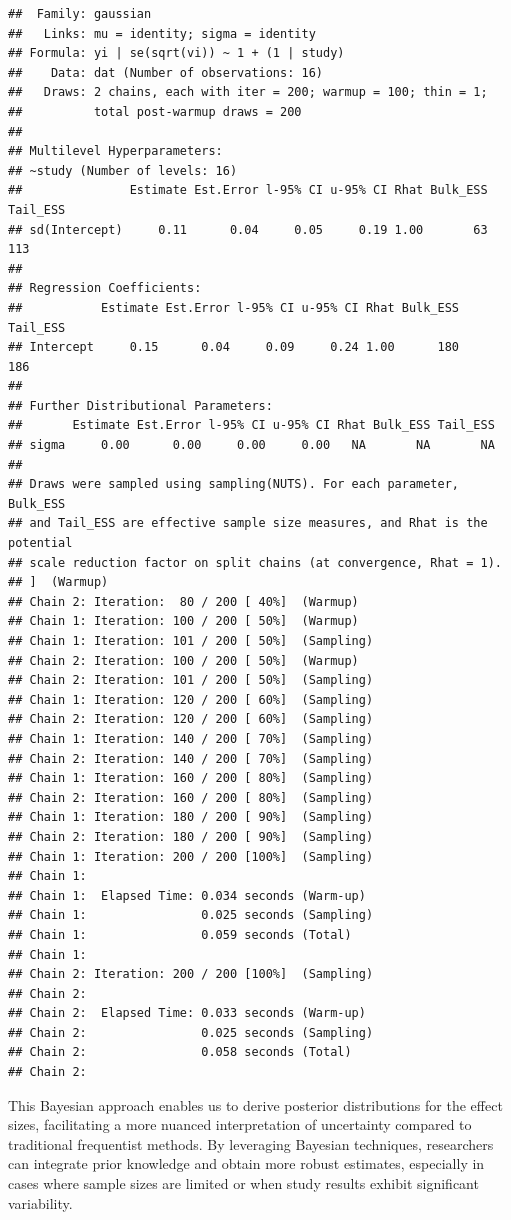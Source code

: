 \documentclass[
]{book}
\begin{document}
\begin{verbatim}
##  Family: gaussian 
##   Links: mu = identity; sigma = identity 
## Formula: yi | se(sqrt(vi)) ~ 1 + (1 | study) 
##    Data: dat (Number of observations: 16) 
##   Draws: 2 chains, each with iter = 200; warmup = 100; thin = 1;
##          total post-warmup draws = 200
## 
## Multilevel Hyperparameters:
## ~study (Number of levels: 16) 
##               Estimate Est.Error l-95% CI u-95% CI Rhat Bulk_ESS Tail_ESS
## sd(Intercept)     0.11      0.04     0.05     0.19 1.00       63      113
## 
## Regression Coefficients:
##           Estimate Est.Error l-95% CI u-95% CI Rhat Bulk_ESS Tail_ESS
## Intercept     0.15      0.04     0.09     0.24 1.00      180      186
## 
## Further Distributional Parameters:
##       Estimate Est.Error l-95% CI u-95% CI Rhat Bulk_ESS Tail_ESS
## sigma     0.00      0.00     0.00     0.00   NA       NA       NA
## 
## Draws were sampled using sampling(NUTS). For each parameter, Bulk_ESS
## and Tail_ESS are effective sample size measures, and Rhat is the potential
## scale reduction factor on split chains (at convergence, Rhat = 1).
## ]  (Warmup)
## Chain 2: Iteration:  80 / 200 [ 40%]  (Warmup)
## Chain 1: Iteration: 100 / 200 [ 50%]  (Warmup)
## Chain 1: Iteration: 101 / 200 [ 50%]  (Sampling)
## Chain 2: Iteration: 100 / 200 [ 50%]  (Warmup)
## Chain 2: Iteration: 101 / 200 [ 50%]  (Sampling)
## Chain 1: Iteration: 120 / 200 [ 60%]  (Sampling)
## Chain 2: Iteration: 120 / 200 [ 60%]  (Sampling)
## Chain 1: Iteration: 140 / 200 [ 70%]  (Sampling)
## Chain 2: Iteration: 140 / 200 [ 70%]  (Sampling)
## Chain 1: Iteration: 160 / 200 [ 80%]  (Sampling)
## Chain 2: Iteration: 160 / 200 [ 80%]  (Sampling)
## Chain 1: Iteration: 180 / 200 [ 90%]  (Sampling)
## Chain 2: Iteration: 180 / 200 [ 90%]  (Sampling)
## Chain 1: Iteration: 200 / 200 [100%]  (Sampling)
## Chain 1: 
## Chain 1:  Elapsed Time: 0.034 seconds (Warm-up)
## Chain 1:                0.025 seconds (Sampling)
## Chain 1:                0.059 seconds (Total)
## Chain 1: 
## Chain 2: Iteration: 200 / 200 [100%]  (Sampling)
## Chain 2: 
## Chain 2:  Elapsed Time: 0.033 seconds (Warm-up)
## Chain 2:                0.025 seconds (Sampling)
## Chain 2:                0.058 seconds (Total)
## Chain 2:
\end{verbatim}

This Bayesian approach enables us to derive posterior distributions for the effect sizes, facilitating a more nuanced interpretation of uncertainty compared to traditional frequentist methods. By leveraging Bayesian techniques, researchers can integrate prior knowledge and obtain more robust estimates, especially in cases where sample sizes are limited or when study results exhibit significant variability.
\end{document}
